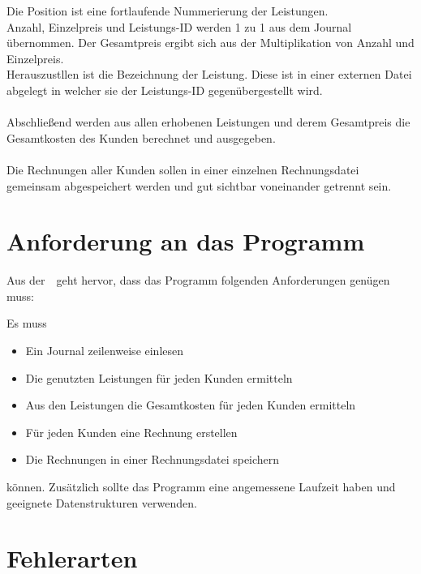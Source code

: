 Die Position ist eine fortlaufende Nummerierung der Leistungen.\\
Anzahl, Einzelpreis und Leistungs-ID werden 1 zu 1 aus dem Journal übernommen. Der Gesamtpreis ergibt sich aus der Multiplikation von Anzahl und Einzelpreis.\\
Herauszustllen ist die Bezeichnung der Leistung. Diese ist in einer externen Datei abgelegt in welcher sie der Leistungs-ID gegenübergestellt wird.\\
\\
Abschließend werden aus allen erhobenen Leistungen und derem Gesamtpreis die Gesamtkosten des Kunden berechnet und ausgegeben.\\
\\
Die Rechnungen aller Kunden sollen in einer einzelnen Rechnungsdatei gemeinsam abgespeichert werden und gut sichtbar voneinander getrennt sein.\\


\section{Anforderung an das Programm}\label{sec:anforderung-an-das-programm}
Aus der~~geht hervor, dass das Programm folgenden Anforderungen genügen muss:

Es muss
\begin{itemize}[noitemsep]
    \item Ein Journal zeilenweise einlesen
    \item Die genutzten Leistungen für jeden Kunden ermitteln
    \item Aus den Leistungen die Gesamtkosten für jeden Kunden ermitteln
    \item Für jeden Kunden eine Rechnung erstellen
    \item Die Rechnungen in einer Rechnungsdatei speichern
\end{itemize}
können.
Zusätzlich sollte das Programm eine angemessene Laufzeit haben und geeignete Datenstrukturen verwenden.

\section{Fehlerarten}\label{sec:fehlerarten}


